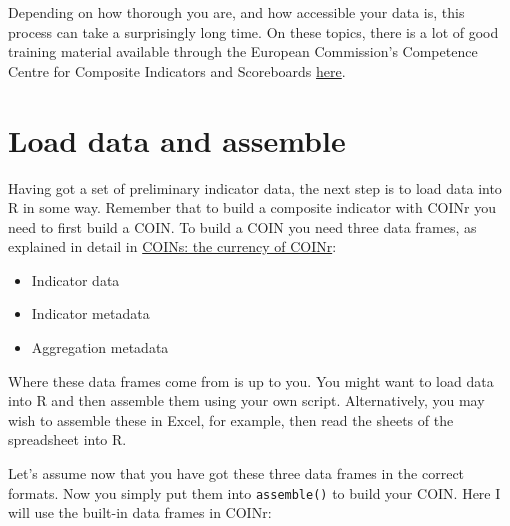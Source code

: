 \documentclass[
]{book}
\providecommand{\tightlist}{%
  \setlength{\itemsep}{0pt}\setlength{\parskip}{0pt}}
\begin{document}
Depending on how thorough you are, and how accessible your data is, this process can take a surprisingly long time. On these topics, there is a lot of good training material available through the European Commission's Competence Centre for Composite Indicators and Scoreboards \href{https://knowledge4policy.ec.europa.eu/composite-indicators/2019-jrc-week-composite-indicators-scoreboards_en}{here}.

\hypertarget{load-data-and-assemble}{%
\section{Load data and assemble}\label{load-data-and-assemble}}

Having got a set of preliminary indicator data, the next step is to load data into R in some way. Remember that to build a composite indicator with COINr you need to first build a COIN. To build a COIN you need three data frames, as explained in detail in \protect\hyperlink{coins-the-currency-of-coinr}{COINs: the currency of COINr}:

\begin{itemize}
\tightlist
\item
  Indicator data
\item
  Indicator metadata
\item
  Aggregation metadata
\end{itemize}

Where these data frames come from is up to you. You might want to load data into R and then assemble them using your own script. Alternatively, you may wish to assemble these in Excel, for example, then read the sheets of the spreadsheet into R.

Let's assume now that you have got these three data frames in the correct formats. Now you simply put them into \texttt{assemble()} to build your COIN. Here I will use the built-in data frames in COINr:
\end{document}
